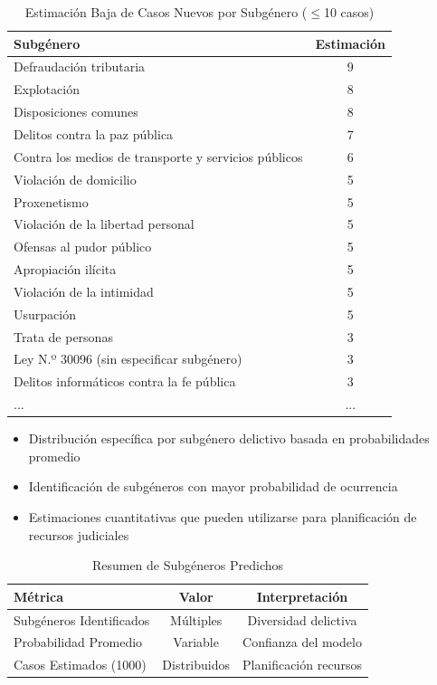 \documentclass[conference]{IEEEtran}
\begin{document}
\begin{table}[htbp]
\caption{Estimación Baja de Casos Nuevos por Subgénero ($\leq$10 casos)}
\centering
\begin{tabular}{|l|c|}
\hline
\textbf{Subgénero} & \textbf{Estimación} \\
\hline
Defraudación tributaria & 9 \\
Explotación & 8 \\
Disposiciones comunes & 8 \\
Delitos contra la paz pública & 7 \\
Contra los medios de transporte y servicios públicos & 6 \\
Violación de domicilio & 5 \\
Proxenetismo & 5 \\
Violación de la libertad personal & 5 \\
Ofensas al pudor público & 5 \\
Apropiación ilícita & 5 \\
Violación de la intimidad & 5 \\
Usurpación & 5 \\
Trata de personas & 3 \\
Ley N.º 30096 (sin especificar subgénero) & 3 \\
Delitos informáticos contra la fe pública & 3 \\
... & ... \\
\hline
\end{tabular}
\label{tab:estimacion_baja}
\end{table}


\begin{itemize}
\item Distribución específica por subgénero delictivo basada en probabilidades promedio
\item Identificación de subgéneros con mayor probabilidad de ocurrencia
\item Estimaciones cuantitativas que pueden utilizarse para planificación de recursos judiciales
\end{itemize}

\begin{table}[htbp]
\caption{Resumen de Subgéneros Predichos}
\begin{center}
\begin{tabular}{|l|c|c|}
\hline
\textbf{Métrica} & \textbf{Valor} & \textbf{Interpretación} \\
\hline
Subgéneros Identificados & Múltiples & Diversidad delictiva \\
\hline
Probabilidad Promedio & Variable & Confianza del modelo \\
\hline
Casos Estimados (1000) & Distribuidos & Planificación recursos \\
\hline
\end{tabular}
\label{tab:resumen}
\end{center}
\end{table}
\end{document}
